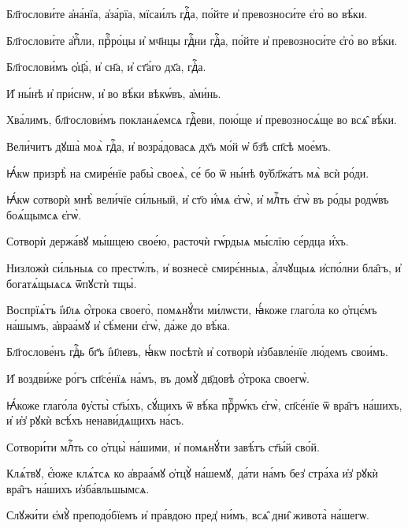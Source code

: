 \hKv Бл҃гослови́те а҆на́нїа, а҆за́рїа, мїсаи́лъ гдⷭ҇а,  по́йте и҆ превозноси́те є҆го̀ во вѣ́ки. 

\hKv Бл҃гослови́те а҆пⷭ҇ли, прⷪ҇ро́цы и҆ мч҃нцы гдⷭ҇ни гдⷭ҇а,  по́йте и҆ превозноси́те є҆го̀ во вѣ́ки. 

\hKv Бл҃гослови́мъ ѻ҆ц҃а̀, и҆ сн҃а, и҆ ст҃а́го дх҃а, гдⷭ҇а. 

\hKv И҆ ны́нѣ и҆ при́снѡ, и҆ во вѣ́ки вѣкѡ́въ, а҆ми́нь. 

 Хва́лимъ, бл҃гослови́мъ покланѧ́емсѧ  гдⷭ҇еви, пою́ще и҆ превозносѧ́ще во всѧ̑ вѣ́ки. 

%

\hKv Вели́читъ дꙋша̀ моѧ̀ гдⷭ҇а, и҆ возра́довасѧ дх҃ъ мо́й ѡ҆  бз҃ѣ сп҃сѣ мое́мъ. 

\hKv Ꙗ҆́кѡ призрѣ̀ на смире́нїе рабы̀ своеѧ̀, се́ бо ѿ ны́нѣ  ᲂу҆бл҃жа́тъ мѧ̀ всѝ ро́ди. 

\hKv Ꙗ҆́кѡ сотворѝ мнѣ̀ вели́чїе си́льный, и҆ ст҃о и҆́мѧ  є҆гѡ̀, и҆ млⷭ҇ть є҆гѡ̀ въ ро́ды родѡ́въ боѧ́щымсѧ є҆гѡ̀. 

\hKv Сотворѝ держа́вꙋ мы́шцею свое́ю, расточѝ гѡ́рдыѧ мы́слїю  се́рдца и҆́хъ. 

\hKv Низложѝ си́льныѧ со престѡ́лъ, и҆ вознесѐ смирє́нныѧ,  а҆́лчꙋщыѧ и҆спо́лни бла̑гъ, и҆ богатѧ́щыѧсѧ ѿпꙋстѝ тщы̀. 

\hKv Воспрїѧ́тъ і҆и҃лѧ ѻ҆́трока своего̀, помѧнꙋ́ти ми́лѡсти,  ꙗ҆́коже глаго́ла ко ѻ҆тцє́мъ на́шымъ, а҆враа́мꙋ и҆  сѣ́мени є҆гѡ̀, да́же до вѣ́ка. 


\hKv Бл҃гослове́нъ гдⷭ҇ь бг҃ъ і҆и҃левъ, ꙗ҆́кѡ посѣтѝ и҆  сотворѝ и҆збавле́нїе лю́демъ свои́мъ.  

\hKv И҆ воздви́же ро́гъ сп҃се́нїѧ на́мъ, въ домꙋ̀ дв҃довѣ  ѻ҆́трока своегѡ̀. 

\hKv Ꙗ҆́коже глаго́ла ᲂу҆сты̀ ст҃ы́хъ, сꙋ́щихъ ѿ вѣ́ка  прⷪ҇рѡ́къ є҆гѡ̀, сп҃се́нїе ѿ вра̑гъ на́шихъ, и҆ и҆з̾  рꙋкѝ всѣ́хъ ненави́дѧщихъ на́съ. 

\hKv Сотвори́ти млⷭ҇ть со ѻ҆тцы̀ на́шими, и҆ помѧнꙋ́ти завѣ́тъ  ст҃ы́й сво́й. 
%

\hKv Клѧ́твꙋ, є҆́юже клѧ́тсѧ ко а҆враа́мꙋ ѻ҆тцꙋ̀  на́шемꙋ, да́ти на́мъ без̾ стра́ха и҆з̾ рꙋкѝ вра̑гъ  на́шихъ и҆зба́вльшымсѧ. 

\hKv Слꙋжи́ти є҆мꙋ̀ преподо́бїемъ и҆ пра́вдою пред̾ ни́мъ, всѧ̑  дни̑ живота̀ на́шегѡ. 
%

